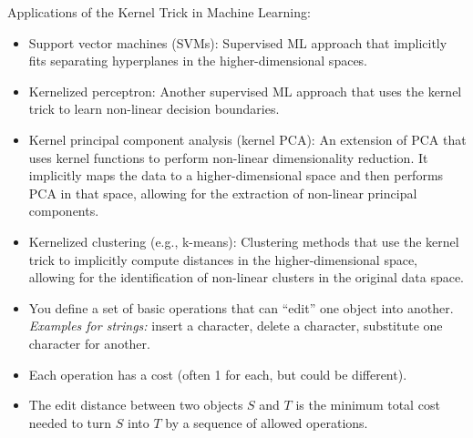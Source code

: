 \documentclass{article}
\begin{document}




Applications of the Kernel Trick in Machine Learning:
\begin{itemize}
    \item Support vector machines (SVMs): Supervised ML approach that implicitly fits separating hyperplanes in the higher-dimensional spaces.
    \item Kernelized perceptron: Another supervised ML approach that uses the kernel trick to learn non-linear decision boundaries.
    \item Kernel principal component analysis (kernel PCA): An extension of PCA that uses kernel functions to perform non-linear dimensionality reduction. It implicitly maps the data to a higher-dimensional space and then performs PCA in that space, allowing for the extraction of non-linear principal components.
    \item Kernelized clustering (e.g., k-means): Clustering methods that use the kernel trick to implicitly compute distances in the higher-dimensional space, allowing for the identification of non-linear clusters in the original data space.
\end{itemize}

\begin{itemize}
    \item You define a set of basic operations that can “edit” one object into another. \textit{Examples for strings: }insert a character, delete a character, substitute one character for another.
    \item Each operation has a cost (often 1 for each, but could be different).
    \item The edit distance between two objects $S$ and $T$ is the minimum total cost needed to turn $S$ into $T$ by a sequence of allowed operations.
\end{itemize}
\end{document}
